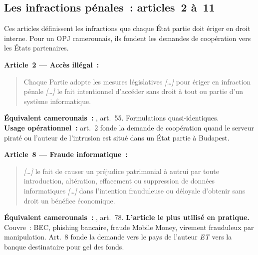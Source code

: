 \subsection{Les infractions pénales~: articles~2 à~11}

Ces articles définissent les infractions que chaque État partie doit
ériger en droit interne. Pour un OPJ camerounais, ils fondent les
demandes de coopération vers les États partenaires.

\begin{boxjuris}
\textbf{Article~2 --- Accès illégal~:}
\begin{quote}
Chaque Partie adopte les mesures législatives \textit{[\ldots]} pour
ériger en infraction pénale \textit{[\ldots]} le fait intentionnel
d'accéder sans droit à tout ou partie d'un système informatique.
\end{quote}
\textbf{Équivalent camerounais~:} , art.~55.
Formulations quasi-identiques.\\
\textbf{Usage opérationnel~:} art.~2 fonde la demande de coopération
quand le serveur piraté ou l'auteur de l'intrusion est situé dans un
État partie à Budapest.
\end{boxjuris}

\begin{boxjuris}
\textbf{Article~8 --- Fraude informatique~:}
\begin{quote}
\textit{[\ldots]} le fait de causer un préjudice patrimonial à autrui
par toute introduction, altération, effacement ou suppression de données
informatiques \textit{[\ldots]} dans l'intention frauduleuse ou déloyale
d'obtenir sans droit un bénéfice économique.
\end{quote}
\textbf{Équivalent camerounais~:} , art.~78.
\textbf{L'article le plus utilisé en pratique.}\\
Couvre~: BEC, phishing bancaire, fraude Mobile Money, virement
frauduleux par manipulation. Art.~8 fonde la demande vers le pays de
l'auteur \emph{ET} vers la banque destinataire pour gel des fonds.
\end{boxjuris}

